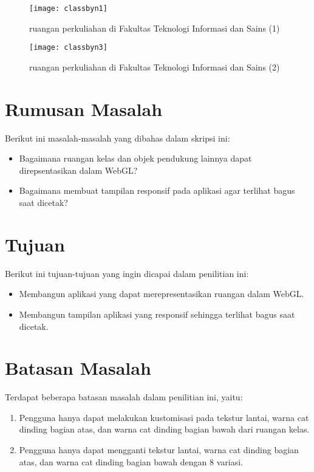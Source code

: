 \begin{figure}
	\centering
	\texttt{[image: classbyn1]}
	\caption{ruangan perkuliahan di Fakultas Teknologi Informasi dan Sains (1)}
	\vspace{8mm}
	\texttt{[image: classbyn3]}
	\caption{ruangan perkuliahan di Fakultas Teknologi Informasi dan Sains (2)}
\end{figure}

\section{Rumusan Masalah}
\label{sec:rumusan}
Berikut ini masalah-masalah yang dibahas dalam skripsi ini:
\begin{itemize}
    \item Bagaimana ruangan kelas dan objek pendukung lainnya dapat direpsentasikan dalam WebGL?
    \item Bagaimana membuat tampilan responsif pada aplikasi agar terlihat bagus saat dicetak?
\end{itemize}

\section{Tujuan}
\label{sec:tujuan}
Berikut ini tujuan-tujuan yang ingin dicapai dalam penilitian ini:
\begin{itemize}
    \item Membangun aplikasi yang dapat merepresentasikan ruangan dalam WebGL.
    \item Membangun tampilan aplikasi yang responsif sehingga terlihat bagus saat dicetak.
\end{itemize}

\section{Batasan Masalah}
\label{sec:batasan}
Terdapat beberapa batasan masalah dalam penilitian ini, yaitu:
\begin{enumerate}
    \item Pengguna hanya dapat melakukan kustomisasi pada tekstur lantai, warna cat dinding bagian atas, dan warna cat dinding bagian bawah dari ruangan kelas.
    \item Pengguna hanya dapat mengganti tekstur lantai, warna cat dinding bagian atas, dan warna cat dinding bagian bawah dengan 8 variasi.
\end{enumerate}

